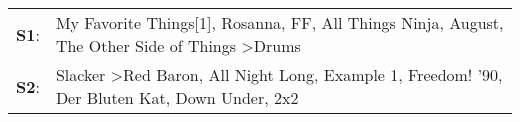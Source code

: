 \begin{supertabular}{p{0.03\textwidth}p{0.92\textwidth}}
 \textbf{S1}:  &                            My Favorite Things[1]\textsuperscript{}, \enspace Rosanna\textsuperscript{}, \enspace FF\textsuperscript{}, \enspace All Things Ninja\textsuperscript{}, \enspace August\textsuperscript{}, \enspace The Other Side of Things\textsuperscript{} \textgreater \enspace Drums\textsuperscript{}  \enspace  \\
 \textbf{S2}:  &  Slacker\textsuperscript{} \textgreater \enspace Red Baron\textsuperscript{}, \enspace All Night Long\textsuperscript{}, \enspace Example 1\textsuperscript{}, \enspace Freedom! '90\textsuperscript{}, \enspace Der Bluten Kat\textsuperscript{}, \enspace Down Under\textsuperscript{}, \enspace 2x2\textsuperscript{}  \enspace  \\
\end{supertabular}
